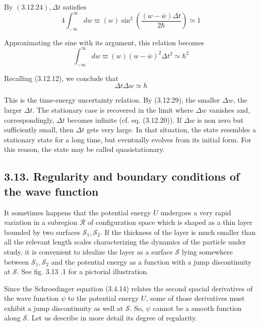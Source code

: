 \documentclass{article}
\begin{document}
By $(3.12 .24), \Delta t$ satisfies
$$
\begin{equation*}
4 \int_{-\infty}^{\infty} d w \varpi(w) \sin ^{2}\left(\frac{(w-\bar{w}) \Delta t}{2 \hbar}\right) \simeq 1 \tag{3.12.27}
\end{equation*}
$$

Approximating the sine with its argument, this relation becomes
$$
\begin{equation*}
\int_{-\infty}^{\infty} d w \varpi(w)(w-\bar{w})^{2} \Delta t^{2} \simeq \hbar^{2} \tag{3.12.28}
\end{equation*}
$$

Recalling (3.12.12), we conclude that
$$
\begin{equation*}
\Delta t \Delta w \simeq \hbar \tag{3.12.29}
\end{equation*}
$$

This is the time-energy uncertainty relation. By (3.12.29), the smaller $\Delta w$, the larger $\Delta t$. The stationary case is recovered in the limit where $\Delta w$ vanishes and, correspondingly, $\Delta t$ becomes infinite (cf. eq. (3.12.20)). If $\Delta w$ is non zero but sufficiently small, then $\Delta t$ gets very large. In that situation, the state resembles a stationary state for a long time, but eventually evolves from its initial form. For this reason, the state may be called quasistationary.

\subsection*{3.13. Regularity and boundary conditions of the wave function}

It sometimes happens that the potential energy $U$ undergoes a very rapid variation in a subregion $\mathcal{R}$ of configuration space which is shaped as a thin layer bounded by two surfaces $\mathcal{S}_{1}, \mathcal{S}_{2}$. If the thickness of the layer is much smaller than all the relevant length scales characterizing the dynamics of the particle under study, it is convenient to idealize the layer as a surface $\mathcal{S}$ lying somewhere between $\mathcal{S}_{1}, \mathcal{S}_{2}$ and the potential energy as a function with a jump discontinuity at $\mathcal{S}$. See fig. 3.13 .1 for a pictorial illustration.

Since the Schroedinger equation (3.4.14) relates the second spacial derivatives of the wave function $\psi$ to the potential energy $U$, some of those derivatives must exhibit a jump discontinuity as well at $\mathcal{S}$. So, $\psi$ cannot be a smooth function along $\mathcal{S}$. Let us describe in more detail its degree of regularity.
\end{document}
